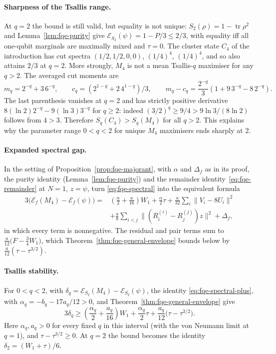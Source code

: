 \paragraph{Sharpness of the Tsallis range.} At \(q=2\) the bound is still valid, but equality is not
unique: \(S_2(\rho)=1-\operatorname{tr}\rho^2\) and Lemma~\ref{lem:fqe-purity} give \(\mathcal
E_{S_2}(\psi)=1-P/3\le2/3\), with equality iff all one-qubit marginals are maximally mixed and
\(\tau=0\). The cluster state $C_4$ of the introduction has cut spectra \((1/2,1/2,0,0)\), \((1/4)^4\), \((1/4)^4\), and so also attains \(2/3\) at
\(q=2\). More strongly, \(M_4\) is not a mean Tsallis-\(q\) maximiser for any \(q>2\). The
averaged cut moments are \[
m_q=2^{-q}+3\,6^{-q},\qquad
c_q=(2^{1-q}+2\,4^{1-q})/3,\qquad
m_q-c_q=\frac{2^{-q}}3(1+9\,3^{-q}-8\,2^{-q}).
\] The last parenthesis vanishes at \(q=2\) and has strictly positive derivative
\(8(\ln2)2^{-q}-9(\ln3)3^{-q}\) for \(q\ge2\): indeed \((3/2)^q\ge9/4>9\ln3/(8\ln2)\) follows from
\(4>3\). Therefore \(S_q(C_4)>S_q(M_4)\) for all \(q>2\). This explains why the parameter range
\(0<q<2\) for unique \(M_4\) maximisers ends sharply at 2.

\paragraph{Expanded spectral gap.} In the setting of Proposition~\ref{prop:fqe-majorant}, with $\alpha$ and $\Delta_f$ as in its proof, the purity identity
(Lemma~\ref{lem:fqe-purity}) and the remainder identity~\eqref{eq:fqe-remainder} at \(N=1\), \(z=\psi\), turn
\eqref{eq:fqe-spectral} into the equivalent formula
\[
\begin{aligned}
3\bigl(\mathcal E_f(M_4)-\mathcal E_f(\psi)\bigr)
={}&\left(\frac\alpha2+\frac{a}{16}\right)W_1+\frac\alpha2\tau+\frac a{32}\sum_i\|V_i-8U_i\|^2\\
&+\frac a8\sum_{i<j}\bigl\|(R_i^{(i)}-R_j^{(j)})z\bigr\|^2+\Delta_f,
\end{aligned}\tag{SF+}\label{eq:fqe-spectral-plus}
\]
in which every term is nonnegative. The residual and pair terms sum to $\frac a{12}\bigl(F-\frac34W_1\bigr)$, which
Theorem~\ref{thm:fqe-general-envelope} bounds below by $\frac a{12}(\tau-\tau^{3/2})$.

\paragraph{Tsallis stability.} For \(0<q<2\), with \(\delta_q=\mathcal E_{S_q}(M_4)-\mathcal
E_{S_q}(\psi)\), the identity \eqref{eq:fqe-spectral-plus}, with \(\alpha_q=-b_q-17a_q/12>0\),
and Theorem~\ref{thm:fqe-general-envelope} give
\[
3\delta_q\ge
\left(\frac{\alpha_q}{2}+\frac{a_q}{16}\right)
W_1+\frac{\alpha_q}{2}\tau+\frac{a_q}{12}\bigl(\tau-\tau^{3/2}\bigr).
\] Here \(\alpha_q,a_q>0\) for every fixed \(q\) in this interval (with the von Neumann limit at \(q=1\)), and
\(\tau-\tau^{3/2}\ge0\). At \(q=2\) the bound becomes the identity \(\delta_2=(W_1+\tau)/6\).

